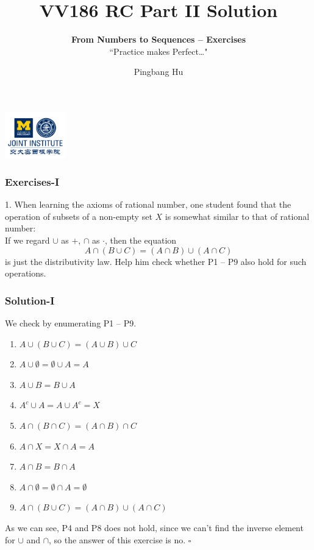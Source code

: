 \documentclass[12pt, t]{beamer}
\title{VV186 RC Part II Solution}
\subtitle{\textbf{From Numbers to Sequences -- Exercises}\\``Practice makes Perfect\dots"}
\institute[UM-SJTU JI]{University of Michigan-Shanghai Jiao Tong University Joint Institute}
\author{Pingbang Hu}
\renewcommand{\emph}[1]{{\color{Turquoise3}\textsl{#1}}}
\newcommand{\myqed}{\hfill$\square$}
\begin{document}
\begin{frame}
    \titlepage
    \begin{center}
        \includegraphics[height=2cm]{Figures/logo/logo2.png}
    \end{center}
\end{frame}

\begin{frame}
    \frametitle{Exercises-I}
    1. When learning the axioms of rational number, one student found that the operation of subsets of a non-empty
    set $X$ is somewhat similar to that of rational number:\\
    \vspace{1em}
    If we regard $\cup$ as $+$, $\cap$ as $\cdot$, then the equation
    \begin{equation*}
        A\cap(B\cup C)=(A\cap B)\cup(A\cap C)
    \end{equation*}
    is just the distributivity law. Help him  check whether P1 -- P9 also hold for such operations.
\end{frame}

\begin{frame}
    \frametitle{Solution-I}
    We check by enumerating P1 -- P9.
    \begin{enumerate}
        \item $A\cup(B\cup C) = (A\cup B)\cup C$
        \item $A\cup \emptyset =\emptyset \cup A=A$
        \item $A\cup B=B\cup A$
        \item \emph{$A^c\cup A=A\cup A^c=X$}
        \item $A\cap(B\cap C) = (A\cap B)\cap C$
        \item $A\cap X = X\cap A=A$
        \item $A\cap B=B\cap A $
        \item \emph{$A\cap \emptyset=\emptyset \cap A=\emptyset$}
        \item $A\cap (B\cup C)=(A\cap B)\cup (A\cap C)$
    \end{enumerate}
    As we can see, P4 and P8 does not hold, since we can't find the inverse element for $\cup$ and $\cap$, so the answer of this
    exercise is no.
    \myqed
\end{frame}
\end{document}
